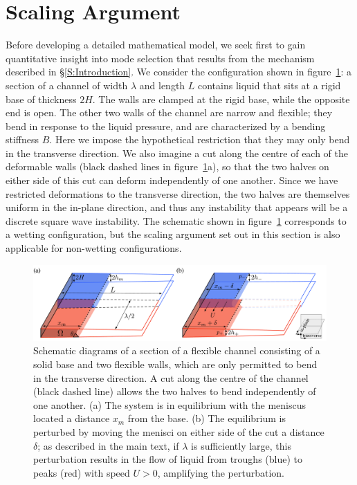 \documentclass{jfm}
\begin{document}
\section{Scaling Argument}\label{S:Scaling}
Before developing a detailed mathematical model, we seek first to gain quantitative insight into mode selection that results from the mechanism described in \S\ref{S:Introduction}. We consider the configuration shown in figure~\ref{fig:Scaling:ScalingArgument}: a section of a channel of width $\lambda$ and length $L$ contains liquid that sits at a rigid base of thickness $2H$. The walls are clamped at the rigid base, while the opposite end is open. The other two walls of the channel are narrow and flexible; they bend in response to the liquid pressure, and are characterized by a bending stiffness $B$. Here we impose the hypothetical restriction that they may only bend in the transverse direction. We also imagine a cut along the centre of each of the deformable walls (black dashed lines in figure~\ref{fig:Scaling:ScalingArgument}a), so that the two halves on either side of this cut can deform independently of one another. Since we have restricted deformations to the transverse direction, the two halves are themselves uniform in the in-plane direction, and thus any instability that appears will be a discrete square wave instability. The schematic shown in figure~\ref{fig:Scaling:ScalingArgument} corresponds to a wetting configuration, but the scaling argument set out in this section is also applicable for non-wetting configurations.

\begin{figure}
\centering
\includegraphics[width = .99\textwidth]{figures/fig3_scaling_argument.pdf}
\caption{Schematic diagrams of a section of a flexible channel consisting of a solid base and two flexible walls, which are only permitted to bend in the transverse direction. A cut along the centre of the channel (black dashed line) allows the two halves to bend independently of one another. (a) The system is in equilibrium with the meniscus located a distance $x_m$ from the base.  (b) The equilibrium is perturbed by moving the menisci on either side of the cut a distance $\delta$; as described in the main text, if $\lambda$ is sufficiently large, this perturbation results in the flow of liquid from troughs (blue) to peaks (red) with speed $U > 0$, amplifying the perturbation.}
\label{fig:Scaling:ScalingArgument}
\end{figure}
\end{document}
